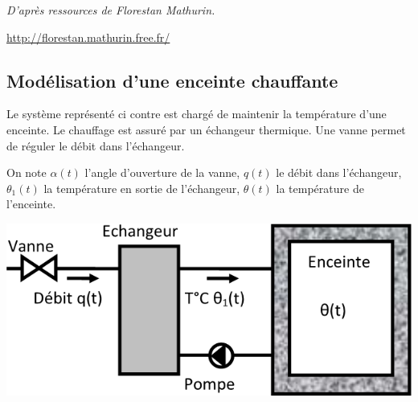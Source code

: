 \documentclass[10pt]{article}
\begin{document}










\setcounter{subparagraph}{0}

\begin{flushright}
\textit{D'après ressources de Florestan Mathurin.}

\url{http://florestan.mathurin.free.fr/}
\end{flushright}

\subsection*{Modélisation d'une enceinte chauffante}

\begin{minipage}[c]{.47\linewidth}

Le système représenté ci contre est chargé de maintenir la température d’une enceinte. Le chauffage est assuré par un échangeur thermique. Une vanne permet de réguler le débit dans l’échangeur. 

On note $\alpha(t)$ l’angle d’ouverture de la vanne, $q(t)$ le débit dans l’échangeur, $\theta_1 (t)$ la 
température en sortie de l’échangeur, $\theta(t)$ la température de l’enceinte.
\end{minipage}\hfill
\begin{minipage}[c]{.47\linewidth}
\begin{center}
\includegraphics[width=.95\textwidth]{images/img1}
\end{center}
\end{minipage}
\end{document}
